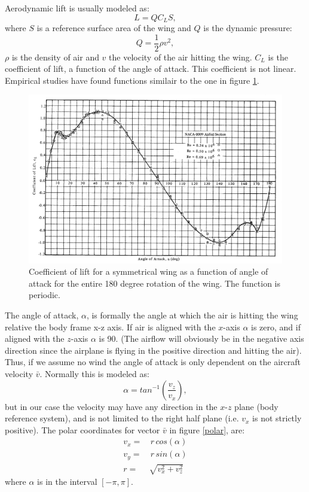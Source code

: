 Aerodynamic lift is usually modeled as\cite{nelson}\cite{aerodynamics}:
\begin{equation}
    L = Q  C_L S,
\end{equation}
where $S$ is a reference surface area of the wing and $Q$ is the dynamic pressure:
\begin{equation}
    Q = \frac{1}{2} \rho v^2,
\end{equation}
$\rho$ is the density of air and $v$ the velocity of the air hitting the wing.
$C_L$ is the coefficient of lift, a function of the angle of attack.
This coefficient is not linear. Empirical studies\cite{aoa180}\cite{aoa180-2} have found functions similair to the one in figure \ref{clalpha}.
\begin{figure}[h]
    \center
    \includegraphics[scale=0.25]{aoa_80s.png}
    \caption{Coefficient of lift for a symmetrical wing as a function of angle of attack for the entire 180 degree rotation of the wing. The function is periodic. \cite{aoa180}}
    \label{clalpha}
\end{figure}

The angle of attack, $\alpha$, is formally the angle at which the air is hitting the wing relative the body frame x-z axis.
If air is aligned with the $x$-axis $\alpha$ is zero, and if aligned with the $z$-axis $\alpha$ is 90.
(The airflow will obviously be in the negative axis direction since the airplane is flying in the positive direction and hitting the air).
Thus, if we assume no wind the angle of attack is only dependent on the aircraft velocity $\bar{v}$.
Normally this is modeled as:
\begin{equation}
    \alpha = tan^{-1}(\frac{v_z}{v_x}),
    \label{eq:aoa}
\end{equation}
but in our case the velocity may have any direction in the $x$-$z$ plane (body reference system), and is not limited to the right half plane (i.e. $v_x$ is not strictly positive).
The polar coordinates for vector $\bar{v}$ in figure \ref{polar}, are:
\begin{equation}\begin{split}
    v_x =& \, r \, cos(\alpha) \\
    v_y =& \, r \, sin(\alpha) \\
    r =& \sqrt{v_x^2 + v_z^2}
    \label{eq:polar}
\end{split}\end{equation}
where $\alpha$ is in the interval $[-\pi,\pi]$.


